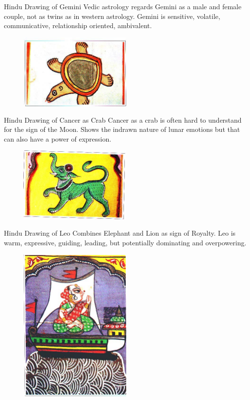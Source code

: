 Hindu Drawing of Gemini
Vedic astrology regards Gemini as a male and female couple, not as twins as in western astrology.
Gemini is sensitive, volatile, communicative, relationship oriented, ambivalent.

 

\begin{figure}[H]
 \centering
\includegraphics[width=0.5\textwidth]{pics/Cancer.png}
 \end{figure}

 

Hindu Drawing of Cancer as Crab
Cancer as a crab is often hard to understand for the sign of the Moon.
Shows the indrawn nature of lunar emotions but that can also have a power of expression.



 \begin{figure}[H]
 \centering
\includegraphics[width=0.5\textwidth]{pics/Leo.png}
 \end{figure}

Hindu Drawing of Leo
Combines Elephant and Lion as sign of Royalty.
Leo is warm, expressive, guiding, leading, but potentially dominating and overpowering.

 
\begin{figure}[H]
 \centering
\includegraphics[width=0.5\textwidth]{pics/Virgo.png}
 \end{figure}


